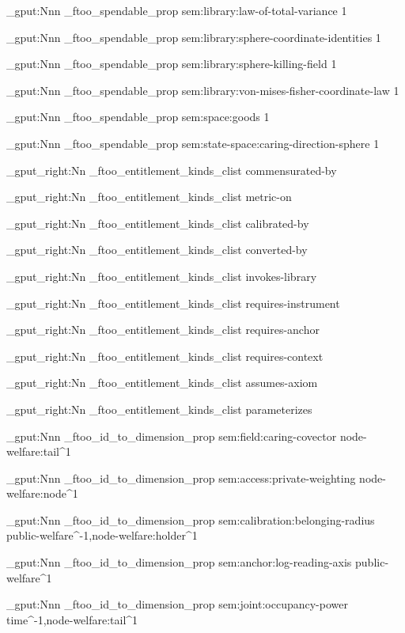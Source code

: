 \prop_gput:Nnn \g_ftoo_spendable_prop { sem:library:law-of-total-variance } { 1 }

\prop_gput:Nnn \g_ftoo_spendable_prop { sem:library:sphere-coordinate-identities } { 1 }

\prop_gput:Nnn \g_ftoo_spendable_prop { sem:library:sphere-killing-field } { 1 }

\prop_gput:Nnn \g_ftoo_spendable_prop { sem:library:von-mises-fisher-coordinate-law } { 1 }

\prop_gput:Nnn \g_ftoo_spendable_prop { sem:space:goods } { 1 }

\prop_gput:Nnn \g_ftoo_spendable_prop { sem:state-space:caring-direction-sphere } { 1 }



\clist_gput_right:Nn \g_ftoo_entitlement_kinds_clist { commensurated-by }

\clist_gput_right:Nn \g_ftoo_entitlement_kinds_clist { metric-on }

\clist_gput_right:Nn \g_ftoo_entitlement_kinds_clist { calibrated-by }

\clist_gput_right:Nn \g_ftoo_entitlement_kinds_clist { converted-by }

\clist_gput_right:Nn \g_ftoo_entitlement_kinds_clist { invokes-library }

\clist_gput_right:Nn \g_ftoo_entitlement_kinds_clist { requires-instrument }

\clist_gput_right:Nn \g_ftoo_entitlement_kinds_clist { requires-anchor }

\clist_gput_right:Nn \g_ftoo_entitlement_kinds_clist { requires-context }

\clist_gput_right:Nn \g_ftoo_entitlement_kinds_clist { assumes-axiom }

\clist_gput_right:Nn \g_ftoo_entitlement_kinds_clist { parameterizes }



\prop_gput:Nnn \g_ftoo_id_to_dimension_prop { sem:field:caring-covector } { node-welfare:tail^1 }

\prop_gput:Nnn \g_ftoo_id_to_dimension_prop { sem:access:private-weighting } { node-welfare:node^1 }

\prop_gput:Nnn \g_ftoo_id_to_dimension_prop { sem:calibration:belonging-radius } { public-welfare^-1,node-welfare:holder^1 }

\prop_gput:Nnn \g_ftoo_id_to_dimension_prop { sem:anchor:log-reading-axis } { public-welfare^1 }

\prop_gput:Nnn \g_ftoo_id_to_dimension_prop { sem:joint:occupancy-power } { time^-1,node-welfare:tail^1 }

